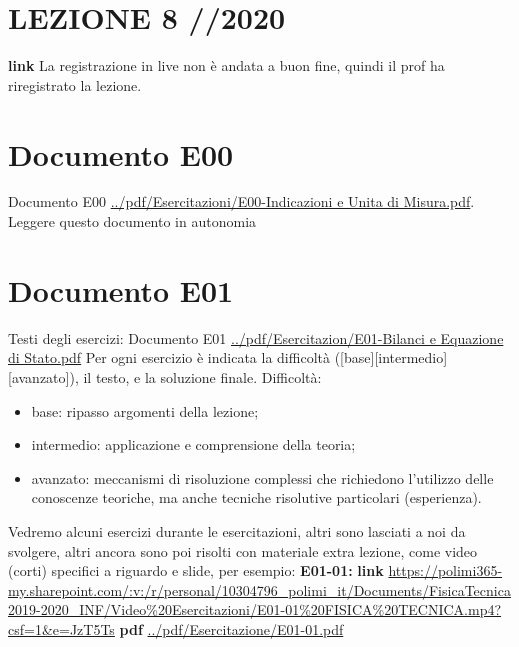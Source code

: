 \section*{LEZIONE 8 //2020}
\textbf{link} \url{}\newline
La registrazione in live non è andata a buon fine, quindi il prof ha riregistrato la lezione.
\section*{Documento E00}
Documento E00 \url{../pdf/Esercitazioni/E00-Indicazioni e Unita di Misura.pdf}.\newline
\newline
Leggere questo documento in autonomia
\section*{Documento E01}
Testi degli esercizi:\newline
Documento E01 \url{../pdf/Esercitazion/E01-Bilanci e Equazione di Stato.pdf}\newline
\newline
Per ogni esercizio è indicata la difficoltà ([base][intermedio][avanzato]), il testo, e la soluzione finale.\newline
Difficoltà:
\begin{itemize}
    \item base: ripasso argomenti della lezione;
    \item intermedio: applicazione e comprensione della teoria;
    \item avanzato: meccanismi di risoluzione complessi che richiedono l'utilizzo delle conoscenze teoriche, ma anche tecniche risolutive particolari (esperienza).
\end{itemize}
Vedremo alcuni esercizi durante le esercitazioni, altri sono lasciati a noi da svolgere, altri ancora sono poi risolti con materiale extra lezione, come video (corti) specifici a riguardo e slide, per esempio:\newline
\newline
\textbf{E01-01:}\newline 
\textbf{link} \url{https://polimi365-my.sharepoint.com/:v:/r/personal/10304796_polimi_it/Documents/FisicaTecnica2019-2020_INF/Video%20Esercitazioni/E01-01%20FISICA%20TECNICA.mp4?csf=1&e=JzT5Ts}\newline
\textbf{pdf} \url{../pdf/Esercitazione/E01-01.pdf}\newline
\newline
